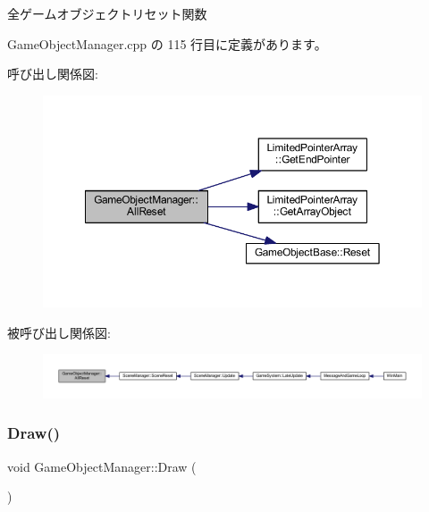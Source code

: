 全ゲームオブジェクトリセット関数 



 Game\+Object\+Manager.\+cpp の 115 行目に定義があります。

呼び出し関係図\+:\nopagebreak
\begin{figure}[H]
\begin{center}
\leavevmode
\includegraphics[width=350pt]{class_game_object_manager_a38f980aec0970f45eb9bc55db8ac01a3_cgraph}
\end{center}
\end{figure}
被呼び出し関係図\+:
\nopagebreak
\begin{figure}[H]
\begin{center}
\leavevmode
\includegraphics[width=350pt]{class_game_object_manager_a38f980aec0970f45eb9bc55db8ac01a3_icgraph}
\end{center}
\end{figure}
\mbox{\label{class_game_object_manager_a0549bd4b6575ee28803c0ff8fd2be2ee}} 
\subsubsection{\texorpdfstring{Draw()}{Draw()}}
{\footnotesize\ttfamily void Game\+Object\+Manager\+::\+Draw (\begin{DoxyParamCaption}{ }\end{DoxyParamCaption})\hspace{0.3cm}{\ttfamily [static]}}



